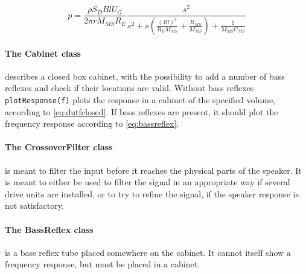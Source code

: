 \begin{equation}
	p = \frac{\rho S_D B l U_G}{2\pi r M_{MS} R_E}\frac{s^2}{s^2 +s \left(\frac{(Bl)^2}{R_EM_{MS}}+\frac{R_{MS}}{M_{MS}}\right)+\frac{1}{M_{MS}C_{MS}}}
	\label{eq:transdriveunit}
\end{equation}

\paragraph{The Cabinet class} describes a closed box cabinet, with the possibility to add a number of bass reflexes and check if their locations are valid.
Without bass reflexes \texttt{plotResponse(f)} plots the response in a cabinet of the specified volume, according to \cref{eq:dutfclosed}.
If bass reflexes are present, it should plot the frequency response according to \cref{eq:bassreflex}.

\paragraph{The CrossoverFilter class} is meant to filter the input before it reaches the physical parts of the speaker.
It is meant to either be used to filter the signal in an appropriate way if several drive units are installed, or to try to refine the signal, if the speaker response is not satisfactory.

\paragraph{The BassReflex class} is a bass reflex tube placed somewhere on the cabinet.
It cannot itself show a frequency response, but must be placed in a cabinet.